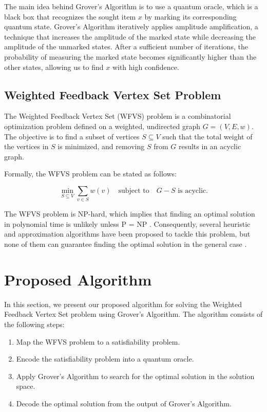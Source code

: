 The main idea behind Grover's Algorithm is to use a quantum oracle, which is a black box that recognizes the sought item $x$ by marking its corresponding quantum state. Grover's Algorithm iteratively applies amplitude amplification, a technique that increases the amplitude of the marked state while decreasing the amplitude of the unmarked states. After a sufficient number of iterations, the probability of measuring the marked state becomes significantly higher than the other states, allowing us to find $x$ with high confidence.

\subsection{Weighted Feedback Vertex Set Problem}

The Weighted Feedback Vertex Set (WFVS) problem is a combinatorial optimization problem defined on a weighted, undirected graph $G = (V, E, w)$. The objective is to find a subset of vertices $S \subseteq V$ such that the total weight of the vertices in $S$ is minimized, and removing $S$ from $G$ results in an acyclic graph.

Formally, the WFVS problem can be stated as follows:

\begin{equation}
\min_{S \subseteq V} \sum_{v \in S} w(v) \quad \text{subject to} \quad G - S \text{ is acyclic.}
\end{equation}

The WFVS problem is NP-hard, which implies that finding an optimal solution in polynomial time is unlikely unless P = NP \cite{karp1972reducibility}. Consequently, several heuristic and approximation algorithms have been proposed to tackle this problem, but none of them can guarantee finding the optimal solution in the general case \cite{cormen2009introduction, li2019improved, nakao1999weighted}.

\section{Proposed Algorithm}
\label{sec:algorithm}

In this section, we present our proposed algorithm for solving the Weighted Feedback Vertex Set problem using Grover's Algorithm. The algorithm consists of the following steps:

\begin{enumerate}
    \item Map the WFVS problem to a satisfiability problem.
    \item Encode the satisfiability problem into a quantum oracle.
    \item Apply Grover's Algorithm to search for the optimal solution in the solution space.
    \item Decode the optimal solution from the output of Grover's Algorithm.
\end{enumerate}

